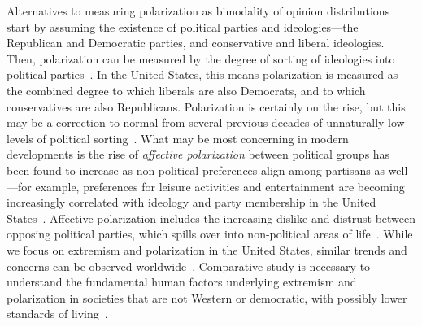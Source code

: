 \documentclass[12pt,letterpaper]{article}
\begin{document}
Alternatives to measuring polarization as bimodality of opinion distributions
start by assuming the existence of political parties and ideologies---the 
Republican and Democratic parties, and conservative and liberal ideologies.
Then, polarization can be measured by the degree of sorting of ideologies
into political parties~\cite{Mason2015}. 
In the United States, this means polarization is measured
as the combined degree to which liberals are also Democrats, and to which 
conservatives are also Republicans. Polarization is certainly on the rise,
but this may be a correction to normal from several previous decades of 
unnaturally low levels of political sorting~\cite{Lee2015,Wood2017b}.
What may be most concerning in modern developments is the rise of
\emph{affective polarization} between political groups has been found to increase as non-political
preferences align among partisans as well---for example, preferences for
leisure activities and entertainment are becoming increasingly correlated
with ideology and party membership in the United States~\cite{Pew2014,DellaPosta2015}.
Affective polarization includes the increasing dislike and distrust between opposing political parties, 
which spills over into non-political areas of life~\cite{Iyengar2019}. 
While we focus on extremism and polarization in the United States, similar trends and concerns can be observed 
worldwide~\cite{Borge-Holthoefer2015,Morales2015,Romenskyy2017,Zmigrod2018}. 
Comparative study is necessary to understand the fundamental human factors underlying
extremism and polarization in societies that are not Western or democratic,
with possibly lower standards of living~\cite{Henrich2010}.
\end{document}
